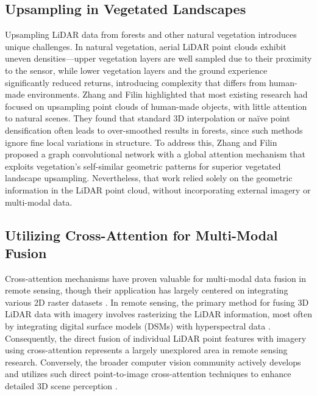 \documentclass[12pt]{report}
\begin{document}
\subsection{Upsampling in Vegetated Landscapes}

Upsampling LiDAR data from forests and other natural vegetation introduces unique challenges. In natural vegetation, aerial LiDAR point clouds exhibit uneven densities—upper vegetation layers are well sampled due to their proximity to the sensor, while lower vegetation layers and the ground experience significantly reduced returns, introducing complexity that differs from human-made environments. Zhang and Filin \cite{zhang2022deep} highlighted that most existing research had focused on upsampling point clouds of human-made objects, with little attention to natural scenes. They found that standard 3D interpolation or naïve point densification often leads to over-smoothed results in forests, since such methods ignore fine local variations in structure. To address this, Zhang and Filin proposed a graph convolutional network with a global attention mechanism that exploits vegetation's self-similar geometric patterns for superior vegetated landscape upsampling. Nevertheless, that work relied solely on the geometric information in the LiDAR point cloud, without incorporating external imagery or multi-modal data.

\subsection{Utilizing Cross-Attention for Multi-Modal Fusion}

Cross-attention mechanisms have proven valuable for multi-modal data fusion in remote sensing, though their application has largely centered on integrating various 2D raster datasets \cite{yan2025remote, ma2022crossmodal, qingyun2022cross, li2024cross}. In remote sensing, the primary method for fusing 3D LiDAR data with imagery involves rasterizing the LiDAR information, most often by integrating digital surface models (DSMs) with hyperspectral data \cite{yu2024dmsca, li2024multi, yang2024lidar}. Consequently, the direct fusion of individual LiDAR point features with imagery using cross-attention represents a largely unexplored area in remote sensing research. Conversely, the broader computer vision community actively develops and utilizes such direct point-to-image cross-attention techniques to enhance detailed 3D scene perception \cite{zhu2024cams, yoo20203d, wu2021point}.
\end{document}
